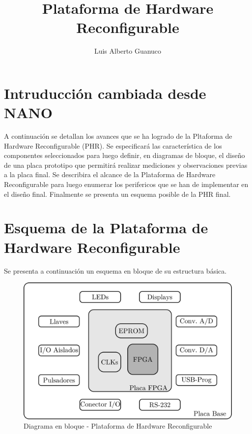 \documentclass[10pt,a4paper]{report}
\title{Plataforma de Hardware Reconfigurable}
\author{Luis Alberto Guanuco}
\begin{document}
\maketitle
\section*{Intruducción cambiada desde NANO}
A continuación se detallan los avances que se ha logrado de la Pltaforma de Hardware Reconfigurable (PHR).
Se especificará las característica de los componentes seleccionados para luego definir, en diagramas de bloque, el diseño de una placa prototipo que permitirá realizar mediciones y observaciones previas a la placa final.
Se describira el alcance de la Plataforma de Hardware Reconfigurable para luego enumerar los perifericos que se han de implementar en el diseño final.
Finalmente se presenta un esquema posible de la PHR final.
\section*{Esquema de la Plataforma de Hardware Reconfigurable}
Se presenta a continuación un esquema en bloque de su estructura básica.
\begin{figure}
 \centering
  \includegraphics[scale=0.4]{g3018.png}
 \caption{Diagrama en bloque - Plataforma de Hardware Reconfigurable}
\end{figure}
\end{document}
